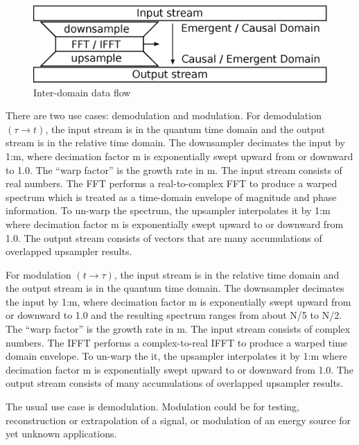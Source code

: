 \begin{figure}
	\centering
	\includegraphics[width=0.95\linewidth]{../source/sled_e}
	\caption[Quantum to Relative Time Translation Flow]{Inter-domain data flow}
	\label{fig:sled}
\end{figure}

There are two use cases: demodulation and modulation.
For demodulation $(\tau \rightarrow t)$, the input stream is in the quantum
time domain and the output stream is in the relative time domain.
The downsampler decimates the input by 1:m, where decimation factor m is
exponentially swept upward from or downward to 1.0.
The ``warp factor'' is the growth rate in m.
The input stream consists of real numbers.
The FFT performs a real-to-complex FFT to produce a warped spectrum which is
treated as a time-domain envelope of magnitude and phase information.
To un-warp the spectrum, the upsampler interpolates it by 1:m where decimation
factor m is exponentially swept upward to or downward from 1.0.
The output stream consists of vectors that are many accumulations of overlapped
upsampler results.

For modulation $(t \rightarrow \tau)$, the input stream is in the relative time
domain and the output stream is in the quantum time domain. The downsampler
decimates the input by 1:m, where decimation factor m is exponentially swept
upward from or downward to 1.0 and the resulting spectrum ranges from about
N/5 to N/2.
The ``warp factor'' is the growth rate in m.
The input stream consists of complex numbers.
The IFFT performs a complex-to-real IFFT to produce a warped time domain
envelope. To un-warp the it, the upsampler interpolates it by 1:m
where decimation factor m is exponentially swept upward to or downward from 1.0.
The output stream consists of many accumulations of overlapped upsampler results.

The usual use case is demodulation.
Modulation could be for testing, reconstruction or extrapolation of a signal,
or modulation of an energy source for yet unknown applications.

